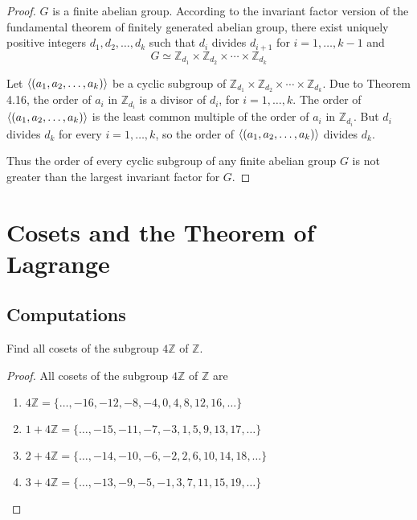 \begin{proof}
    $G$ is a finite abelian group. According to the invariant factor version of the fundamental theorem of finitely generated abelian group, there exist uniquely positive integers $d_{1}, d_{2}, \ldots, d_{k}$ such that $d_{i}$ divides $d_{i+1}$ for $i = 1,\ldots,k-1$ and
    \[
        G \simeq \mathbb{Z}_{d_{1}} \times \mathbb{Z}_{d_{2}} \times \cdots \times \mathbb{Z}_{d_{k}}
    \]

    Let $\left\langle{(a_{1}, a_{2}, \ldots, a_{k})}\right\rangle$ be a cyclic subgroup of $\mathbb{Z}_{d_{1}} \times \mathbb{Z}_{d_{2}} \times \cdots \times \mathbb{Z}_{d_{k}}$. Due to Theorem 4.16, the order of $a_{i}$ in $\mathbb{Z}_{d_{i}}$ is a divisor of $d_{i}$, for $i = 1,\ldots, k$. The order of $\left\langle{(a_{1}, a_{2}, \ldots, a_{k})}\right\rangle$ is the least common multiple of the order of $a_{i}$ in $\mathbb{Z}_{d_{i}}$. But $d_{i}$ divides $d_{k}$ for every $i = 1,\ldots, k$, so the order of $\left\langle{(a_{1}, a_{2}, \ldots, a_{k})}\right\rangle$ divides $d_{k}$.

    Thus the order of every cyclic subgroup of any finite abelian group $G$ is not greater than the largest invariant factor for $G$.
\end{proof}

\section{Cosets and the Theorem of Lagrange}

\subsection*{Computations}

\begin{exercise}
    Find all cosets of the subgroup $4\mathbb{Z}$ of $\mathbb{Z}$.
\end{exercise}

\begin{proof}
    All cosets of the subgroup $4\mathbb{Z}$ of $\mathbb{Z}$ are
    \begin{enumerate}[label={(\arabic*)}]
        \item $4\mathbb{Z} = \{ \ldots, -16, -12, -8, -4, 0, 4, 8, 12, 16, \ldots \}$
        \item $1 + 4\mathbb{Z} = \{ \ldots, -15, -11, -7, -3, 1, 5, 9, 13, 17, \ldots \}$
        \item $2 + 4\mathbb{Z} = \{ \ldots, -14, -10, -6, -2, 2, 6, 10, 14, 18, \ldots \}$
        \item $3 + 4\mathbb{Z} = \{ \ldots, -13, -9, -5, -1, 3, 7, 11, 15, 19, \ldots \}$
    \end{enumerate}
\end{proof}

